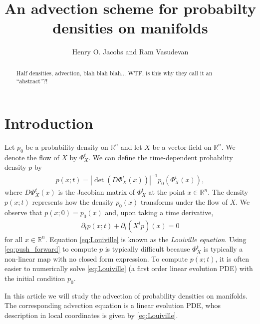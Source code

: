 \documentclass[letterpaper, 10 pt, conference]{ieeeconf}
\title{\LARGE \bf
  An advection scheme for probabilty densities on manifolds
}
\author{Henry O. Jacobs and Ram Vasudevan}%
\newcommand{\R}{\mathbb{R}}
\begin{document}
\maketitle
\thispagestyle{empty}
\pagestyle{empty}


\begin{abstract}
Half densities, advection, blah blah blah...
WTF, is this why they call it an ``abstract''?!

\end{abstract}


\section{Introduction}
  Let $p_0$ be a probability density on $\R^n$
  and let $X$ be a vector-field on $\R^n$.
  We denote the flow of $X$
  by $\Phi_X^t$.
  We can define the time-dependent probability
  density $p$ by
  \begin{align}
    p( x ; t) = 
    | \det( D\Phi_X^t(x) ) |^{-1} p_0( \Phi_X^t(x) ), \label{eq:push_forward}
  \end{align}
  where $D\Phi_X^t(x)$ is the Jacobian matrix of
  $\Phi_X^t$ at the point $x \in \R^n$.
  The density $p(x;t)$ represents how the density
  $p_0(x)$ transforms under the flow of $X$.
  We observe that $p(x;0) = p_0(x)$ and, upon taking
  a time derivative,
  \begin{align}
    \partial_t p (x;t) + \partial_i (X^i p)(x) = 0 \label{eq:Louiville}
  \end{align}
  for all $x \in \R^n$.
  Equation \eqref{eq:Louiville} is known as the \emph{Louiville equation}.
  Using \eqref{eq:push_forward} to compute $p$ is typically difficult
  because $\Phi_X^t$ is typically a non-linear map with no closed
  form expression.
  To compute $p( x ; t)$, it is often easier
  to numerically solve \eqref{eq:Louiville}
  (a first order linear evolution PDE)
  with the initial condition $p_0$.
  
  In this article we will study the advection of probability
  densities on manifolds.
  The corresponding advection equation is a linear
  evolution PDE, whos description in local coordinates is 
  given by \eqref{eq:Louiville}.
\end{document}
